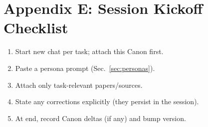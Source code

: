\documentclass[11pt]{article}
\begin{document}
            \normalsize
\section*{Appendix E: Session Kickoff Checklist}
        \begin{enumerate}
        \item Start new chat per task; attach this Canon first.
        \item Paste a persona prompt (Sec.~\ref{sec:personas}).
        \item Attach only task-relevant papers/sources.
        \item State any corrections explicitly (they persist in the session).
        \item At end, record Canon deltas (if any) and bump version.
        \end{enumerate}

        \nocite{*}
        
        
\end{document}
